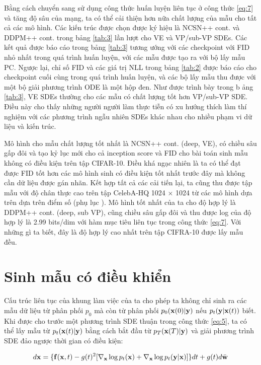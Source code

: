 \documentclass{article} %
\begin{document}
Bằng cách chuyển sang sử dụng công thức huấn luyện liên tục ở công thức \ref{eq:7} và tăng độ sâu của mạng, ta có thể cải thiện hơn nữa chất lượng của mẫu cho tất cả các mô hình.
Các kiến trúc được chọn được ký hiệu là NCSN++ cont. và DDPM++ cont. trong bảng \ref{tab:3} lần lượt cho VE và VP/sub-VP SDEs.
Các kết quả được báo cáo trong bảng \ref{tab:3} tương ướng với các checkpoint với FID nhỏ nhất trong quá trình huấn luyện, với các mẫu được tạo ra với bộ lấy mẫu PC.
Ngược lại, chỉ số FID và các giá trị NLL trong bảng \ref{tab:2} được báo cáo cho checkpoint cuối cùng trong quá trình huấn luyện, và các bộ lấy mẫu thu được với một bộ giải phương trình ODE là một hộp đen.
Như được trình bày trong b ảng \ref{tab:3}, VE SDEs thường cho các mẫu có chất lượng tốt hơn VP/sub-VP SDE.
Điều này cho thấy những người người làm thực tiễn có xu hướng thích làm thí nghiệm với các phương trình ngẫu nhiên SDEs khác nhau cho nhiều phạm vi dữ liệu và kiến trúc.

Mô hình cho mẫu chất lượng tốt nhất là NCSN++ cont. (deep, VE), có chiều sâu gấp đôi và tạo kỷ lục mới cho cả inception score và FID cho bài toán sinh mẫu không có điều kiện trên tập CIFAR-10.
Điều khá ngạc nhiên là ta có thể đạt được FID tốt hơn các mô hình sinh có điều kiện tốt nhất trước đây mà không cần dữ liệu được gán nhãn.
Kết hợp tất cả các cải tiến lại, ta cũng thu được tập mẫu với độ chân thực cao trên tập CelebA-HQ 1024 $\times$ 1024 từ các mô hình dựa trên dựa trên điểm số (phụ lục ).
Mô hình tốt nhất của ta cho độ hợp lý là DDPM++ cont. (deep, sub VP), cũng chiều sâu gấp đôi và thu được log của độ hợp lý là 2.99 bits/dim với hàm mục tiêu liên tục trong công thức \ref{eq:7}.
Với những gì ta biết, đây là độ hợp lý cao nhất trên tập CIFRA-10 được lấy mẫu đều.

\section{Sinh mẫu có điều khiển}

Cấu trúc liên tục của khung làm việc của ta cho phép ta không chỉ sinh ra các mẫu dữ liệu từ phân phối $p_0$ mà còn từ phân phối $p_0 (\bold{x}(0) \vert \bold{y})$ nếu $p_t (\bold{y} \vert \bold{x}(t))$ biết.
Khi được cho trước một phương trình SDE thuận trong công thức \ref{eq:5}, ta có thể lấy mẫu từ $p_t(\bold{x}(t) \vert \bold{y})$ bằng cách bắt đầu từ $p_T (\bold{x}(T) \vert \bold{y})$ và giải phương trình SDE đảo ngược thời gian có điều kiện:

\begin{equation} \label{eq:14}
    d \bold{x} = \lbrace \bold{f}(\bold{x}, t) - g (t)^2 \lbrack \nabla_{\bold{x}} \log p_t(\bold{x}) + \nabla_{\bold{x}} \log p_t (\bold{y} \vert \bold{x}) \rbrack \rbrace dt + g(t) d \bar{\bold{w}}
\end{equation}
\end{document}
